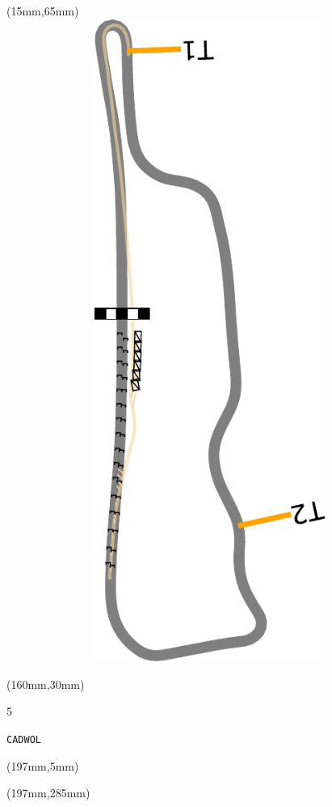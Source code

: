 \begin{textblock*}{185mm}(15mm,65mm)%
\centering
\mbox{\includegraphics[width=185mm,height=210mm,keepaspectratio]{PT/CADWOL.pdf}}
\end{textblock*}
\begin{textblock*}{40mm}(160mm,30mm)%
\Large
\par{} 
\par5 
\par\hfill\tiny\tt CADWOL\\
\end{textblock*}
\begin{textblock*}{20mm}(197mm,5mm)%
\fbox{\thepage}
\label{CADWOL}
\end{textblock*}
\begin{textblock*}{20mm}(197mm,285mm)%
\fbox{\thepage}
\end{textblock*}


